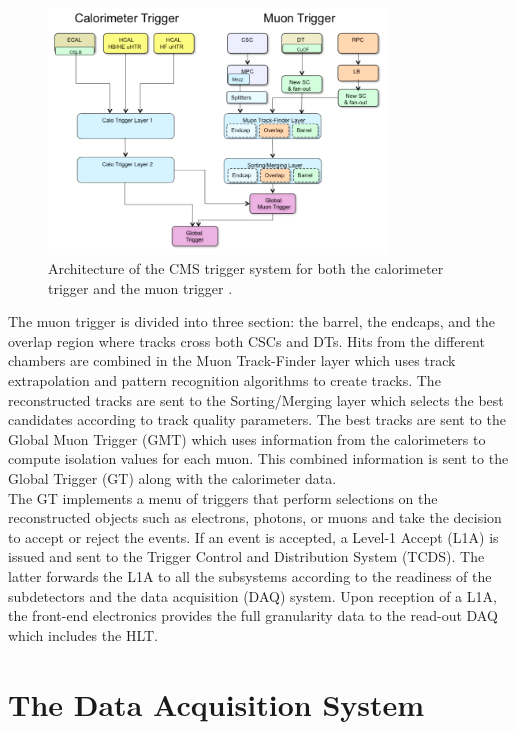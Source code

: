    \begin{figure}[h!]
      \centering
      \includegraphics[width=0.8\textwidth]{img/I-3-cms/l1.png}
      \caption{Architecture of the CMS trigger system for both the calorimeter trigger and the muon trigger \cite{1748-0221-3-08-S08004}.}
      \label{fig:I-3-l1}
    \end{figure}

    The muon trigger is divided into three section: the barrel, the endcaps, and the overlap region where tracks cross both CSCs and DTs. Hits from the different chambers are combined in the Muon Track-Finder layer which uses track extrapolation and pattern recognition algorithms to create tracks. The reconstructed tracks are sent to the Sorting/Merging layer which selects the best candidates according to track quality parameters. The best tracks are sent to the Global Muon Trigger (GMT) which uses information from the calorimeters to compute isolation values for each muon. This combined information is sent to the Global Trigger (GT) along with the calorimeter data. \\

    The GT implements a menu of triggers that perform selections on the reconstructed objects such as electrons, photons, or muons and take the decision to accept or reject the events. If an event is accepted, a Level-1 Accept (L1A) is issued and sent to the Trigger Control and Distribution System (TCDS). The latter forwards the L1A to all the subsystems according to the readiness of the subdetectors and the data acquisition (DAQ) system. Upon reception of a L1A, the front-end electronics provides the full granularity data to the read-out DAQ which includes the HLT.

  \section{The Data Acquisition System}

